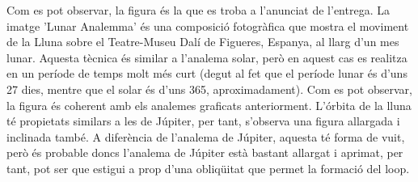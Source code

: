 \documentclass[a4paper, 11pt]{article}
\begin{document}
\noindent Com es pot observar, la figura és la que es troba a l'anunciat de l'entrega. La imatge 'Lunar Analemma' és una composició fotogràfica que mostra el moviment de la Lluna sobre el Teatre-Museu Dalí de Figueres, Espanya, al llarg d'un mes lunar. Aquesta tècnica és similar a l'analema solar, però en aquest cas es realitza en un període de temps molt més curt (degut al fet que el període lunar és d'uns 27 dies, mentre que el solar és d'uns 365, aproximadament). Com es pot observar, la figura és coherent amb els analemes graficats anteriorment. L'órbita de la lluna té propietats similars a les de Júpiter, per tant, s'observa una figura allargada i inclinada també. A diferència de l'analema de Júpiter, aquesta té forma de vuit, però és probable doncs l'analema de Júpiter està bastant allargat i aprimat, per tant, pot ser que estigui a prop d'una obliqüitat que permet la formació del loop.




\newpage
\printbibliography
\end{document}
